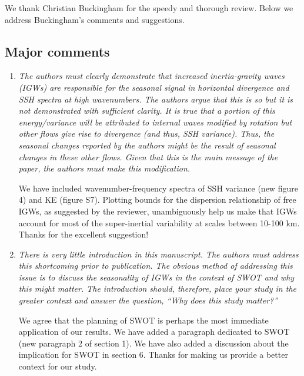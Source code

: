 \documentclass[11pt]{article}
\newcommand{\bdp}{\begin{description}}
\newcommand{\edp}{\end{description}}
\begin{document}
        We thank  Christian Buckingham for the speedy and thorough review. Below we address
                  Buckingham's comments and suggestions.


\subsection{Major comments}

\begin{enumerate}

  \item {\it The authors must clearly demonstrate that increased inertia-gravity waves (IGWs) are
        responsible for the seasonal signal in horizontal divergence and SSH spectra at high
        wavenumbers. The authors argue that this is so but it is not demonstrated with sufficient
        clarity. It is true that a portion of this energy/variance will be attributed to internal waves
        modified by rotation but other flows give rise to divergence (and thus, SSH variance). Thus,
        the seasonal changes reported by the authors might be the result of seasonal changes in these
        other flows. Given that this is the main message of the paper, the authors must make this
        modification.}\\

        \bdp
            We have included wavenumber-frequency
            spectra of SSH variance (new figure 4) and KE (figure S7). Plotting bounds for the
            dispersion relationship of free IGWs, as suggested by the reviewer, unambiguously
            help us make that IGWs account for most of the super-inertial variability at
            scales between 10-100 km. Thanks for the excellent suggestion!
        \edp

  \item {\it There is very little introduction in this manuscript. The authors must address this
          shortcoming prior to publication. The obvious method of addressing this issue is to discuss
          the seasonality of IGWs in the context of SWOT and why this might matter. The introduction
          should, therefore, place your study in the greater context and answer the question,
          ``Why does this study matter?''}\\

          \bdp
              We agree that the planning of SWOT is perhaps the most immediate
              application of our results. We have added a paragraph dedicated to SWOT (new
              paragraph 2 of section 1). We have also added a discussion about the
              implication for SWOT in section 6. Thanks for making us provide a better
              context for our study.
          \edp


\end{enumerate}
\end{document}
